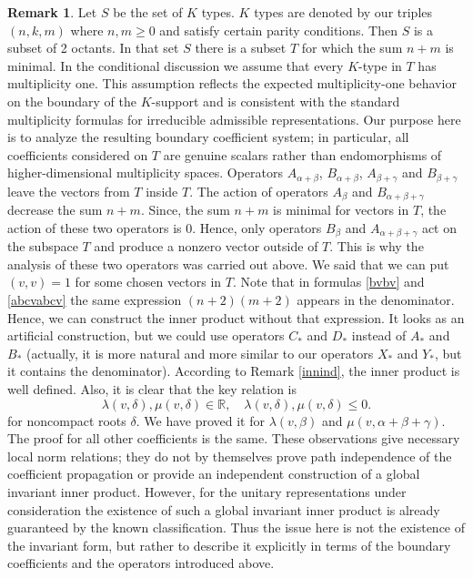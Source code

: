 \documentclass[twoside,a4paper,12pt]{article}
\newcommand{\R}{\ensuremath{\mathbb R}}
\theoremstyle{definition}
\newtheorem{remark}{Remark}
\begin{document}
\begin{remark}
	Let $S$ be the set of $K$ types. $K$ types are denoted by our triples
	$(n,k,m)$ where $n,m\geq0$ and satisfy certain parity conditions.
	Then $S$ is a subset of 2 octants. In that set $S$ there is a subset
	$T$ for which the sum $n+m$ is minimal.
	In the conditional discussion we assume that every $K$-type in $T$ has
	multiplicity one. This assumption reflects the expected multiplicity-one
	behavior on the boundary of the $K$-support and is consistent with the
	standard multiplicity formulas for irreducible admissible representations.
	Our purpose here is to analyze the resulting boundary coefficient system; in
	particular, all coefficients considered on $T$ are genuine scalars rather
	than endomorphisms of higher-dimensional multiplicity spaces.
	Operators $A_{\alpha+\beta}$, $B_{\alpha+\beta}$,
	$A_{\beta+\gamma}$ and $B_{\beta+\gamma}$ leave the vectors from 
	$T$ inside $T$. The action of operators $A_\beta$ and
	$B_{\alpha+\beta+\gamma}$ decrease the sum $n+m$. Since, the sum
	$n+m$ is minimal for vectors in $T$, the action of these two operators is 0.
	Hence, only operators $B_\beta$ and $A_{\alpha+\beta+\gamma}$ act on the
	subspace $T$ and produce a nonzero vector outside of $T$. This is why the
	analysis of these two operators was carried out above. We said that we
	can put $(v,v)=1$ for some chosen vectors in $T$. Note
	that in formulas \eqref{bvbv} and \eqref{abcvabcv} the same expression
	$(n+2)(m+2)$ appears in the denominator. Hence, we can construct the inner
	product without that expression. It looks as an artificial construction,
	but we could use operators $C_*$ and $D_*$ instead of $A_*$ and $B_*$
	(actually, it is more natural and more similar to our operators $X_*$
	and $Y_*$, but it contains the denominator). According to
	Remark \ref{innind}, the inner product is well defined. Also, it is
	clear that the key relation is
	\begin{equation}\label{dneg}
		\lambda(v,\delta),\mu(v,\delta)\in\R,\quad
		\lambda(v,\delta),\mu(v,\delta)\leq0.
	\end{equation}
	for noncompact roots $\delta$. We have proved it for
	$\lambda(v,\beta)$ and $\mu(v,\alpha+\beta+\gamma)$.
	The proof for all other coefficients is the same.
	These observations give necessary local norm relations; they do not by
	themselves prove path independence of the coefficient propagation or provide
	an independent construction of a global invariant inner product. However,
	for the unitary representations under consideration the existence of such a
	global invariant inner product is already guaranteed by the known
	classification. Thus the issue here is not the existence of the invariant
	form, but rather to describe it explicitly in terms of the boundary
	coefficients and the operators introduced above.
\end{remark}
\end{document}
